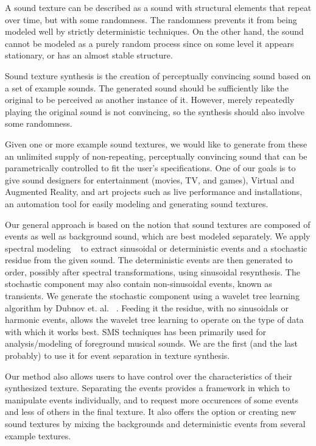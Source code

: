 \documentclass{acmsiggraph}               %
\begin{document}
A sound texture can be described as a sound with structural elements that repeat over time, 
but with some randomness. The randomness prevents it from being modeled well by strictly 
deterministic techniques. On the other hand, the sound cannot be modeled as a purely random 
process since on some level it appears stationary, or has an almost stable structure.

Sound texture synthesis is the creation of perceptually convincing sound based on a set of 
example sounds. The generated sound should be sufficiently like the original to be perceived 
as another instance of it. However, merely repeatedly playing the original sound is not 
convincing, so the synthesis should also involve some randomness. 

Given one or more example sound textures, we would like to generate from these an unlimited 
supply of non-repeating, perceptually convincing sound that can be parametrically controlled 
to fit the user's specifications. One of our goals is to give sound designers for 
entertainment (movies, TV, and games), Virtual and Augmented Reality, and art projects such as 
live performance and installations, an automation tool for easily modeling and generating 
sound textures.

Our general approach is based on the notion that sound textures are composed of events as well 
as background sound, which are best modeled separately. We apply spectral modeling 
~\cite{Serra89} to extract sinusoidal or deterministic events and a stochastic residue from 
the given sound. The deterministic events are then generated to order, possibly after spectral 
transformations, using sinusoidal resynthesis. The stochastic component may also contain 
non-sinusoidal events, known as transients. We generate the stochastic component using a 
wavelet tree learning algorithm by Dubnov et. al. ~. Feeding it the 
residue, with no sinusoidals or harmonic events, allows the wavelet tree learning to operate 
on the type of data with which it works best.  SMS techniques has been primarily used for 
analysis/modeling of foreground musical sounds.  We are the first (and the last probably) to 
use it for event separation in texture synthesis.

Our method also allows users to have control over the characteristics of their synthesized 
texture. Separating the events provides a framework in which to manipulate events 
individually, and to request more occurences of some events and less of others in the final 
texture. It also offers the option or creating new sound textures by mixing the backgrounds 
and deterministic events from several example textures.
\end{document}
